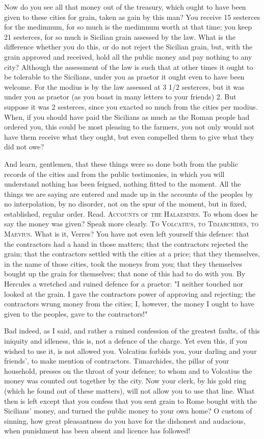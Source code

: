  Now do you see all that money out of the treasury, which ought to have been given to these cities for grain, taken as gain by this man? You receive 15 sesterces for the medimnum, for so much is the medimnum worth at that time; you keep 21 sesterces, for so much is Sicilian grain assessed by the law. What is the difference whether you do this, or do not reject the Sicilian grain, but, with the grain approved and received, hold all the public money and pay nothing to any city? Although the assessment of the law is such that at other times it ought to be tolerable to the Sicilians, under you as praetor it ought even to have been welcome. For the modius is by the law assessed at 3 1/2 sesterces, but it was under you as praetor (as you boast in many letters to your friends) 2. But suppose it was 2 sesterces, since you exacted so much from the cities per modius. When, if you should have paid the Sicilians as much as the Roman people had ordered you, this could be most pleasing to the farmers, you not only would not have them receive what they ought, but even compelled them to give what they did not owe?

 And learn, gentlemen, that these things were so done both from the public records of the cities and from the public testimonies, in which you will understand nothing has been feigned, nothing fitted to the moment. All the things we are saying are entered and made up in the accounts of the peoples by no interpolation, by no disorder, not on the spur of the moment, but in fixed, established, regular order. Read. \textsc{Accounts of the Halaesines}. To whom does he say the money was given? Speak more clearly. \textsc{To Volcatius, to Timarchides, to Maevius}. What is it, Verres? You have not even left yourself this defence: that the contractors had a hand in those matters; that the contractors rejected the grain; that the contractors settled with the cities at a price; that they themselves, in the name of those cities, took the moneys from you; that they themselves bought up the grain for themselves; that none of this had to do with you. By Hercules a wretched and ruined defence for a praetor: "I neither touched nor looked at the grain. I gave the contractors power of approving and rejecting; the contractors wrung money from the cities; I, however, the money I ought to have given to the peoples, gave to the contractors!"

 Bad indeed, as I said, and rather a ruined confession of the greatest faults, of this iniquity and idleness, this is, not a defence of the charge. Yet even this, if you wished to use it, is not allowed you. Volcatius forbids you, your darling and your friends', to make mention of contractors. Timarchides, the pillar of your household, presses on the throat of your defence; to whom and to Volcatius the money was counted out together by the city. Now your clerk, by his gold ring (which he found out of these matters), will not allow you to use that line. What then is left except that you confess that you sent grain to Rome bought with the Sicilians' money, and turned the public money to your own home? O custom of sinning, how great pleasantness do you have for the dishonest and audacious, when punishment has been absent and licence has followed!

